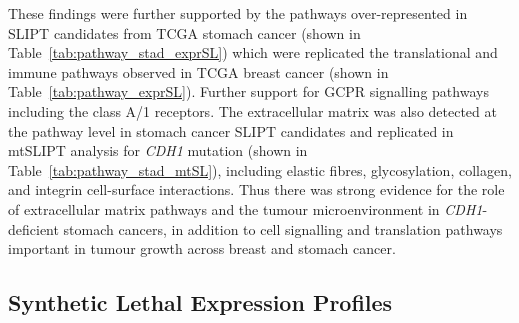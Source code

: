 These findings were further supported by the \glspl{pathway} over-represented in \gls{SLIPT} candidates from \gls{TCGA} stomach cancer (shown in Table~\ref{tab:pathway_stad_exprSL}) which were replicated the translational and immune \glspl{pathway} observed in \gls{TCGA} breast cancer (shown in Table~\ref{tab:pathway_exprSL}). Further support for GCPR signalling \glspl{pathway} including the class A/1 receptors. The extracellular matrix was also detected at the \gls{pathway} level in stomach cancer \gls{SLIPT} candidates and replicated in \acrshort{mtSLIPT} analysis for \textit{CDH1} \gls{mutation} (shown in Table~\ref{tab:pathway_stad_mtSL}), including elastic fibres, glycosylation, collagen, and integrin cell-surface interactions. Thus there was strong evidence for the role of extracellular matrix \glspl{pathway} and the tumour microenvironment in \textit{CDH1}-deficient stomach cancers, in addition to cell signalling and translation \glspl{pathway} important in tumour growth across breast and stomach cancer.





\FloatBarrier

\subsection{Synthetic Lethal Expression Profiles} \label{chapt3:stad_SL_clusters}



